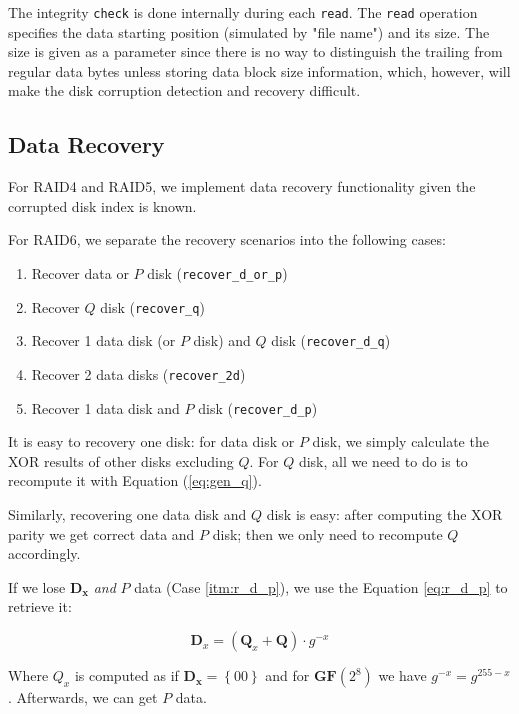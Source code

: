 The integrity \verb|check| is done internally during each \verb|read|. The \verb|read| operation specifies the data starting position (simulated by "file name") and its size. The size is given as a parameter since there is no way to distinguish the trailing from regular data bytes unless storing data block size information, which, however, will make the disk corruption detection and recovery difficult.

\subsection{Data Recovery}

For RAID4 and RAID5, we implement data recovery functionality given the corrupted disk index is known. 

For RAID6, we separate the recovery scenarios into the following cases:

\begin{enumerate}
	\item\label{itm:r_d_OR_p} Recover data or $P$ disk (\verb|recover_d_or_p|)
	\item \label{itm:r_q} Recover $Q$ disk (\verb|recover_q|)
	\item \label{itm:r_d_q} Recover 1 data disk (or $P$ disk) and $Q$ disk (\verb|recover_d_q|)
	\item \label{itm:r_2d} Recover 2 data disks (\verb|recover_2d|)
	\item \label{itm:r_d_p} Recover 1 data disk and $P$ disk (\verb|recover_d_p|)
\end{enumerate}

It is easy to recovery one disk: for data disk or $P$ disk, we simply calculate the XOR results of other disks excluding $Q$. For $Q$ disk, all we need to do is to recompute it with Equation (\ref{eq:gen_q}).

Similarly, recovering one data disk and $Q$ disk is easy: after computing the XOR parity we get correct data and $P$ disk; then we only need to recompute $Q$ accordingly.

If we lose $\mathbf{D_x}$ \emph{and} $P$ data (Case \ref{itm:r_d_p}), we use the Equation \ref{eq:r_d_p} to retrieve it:

\begin{equation}\label{eq:r_d_p}
	\mathbf{D}_x = (\mathbf{Q}_x+\mathbf{Q})\cdot g^{-x}
\end{equation}

Where $\mathbf{}Q_x$ is computed as if $\mathbf{D_x}=\left\{00\right\}$ and for $\mathbf{GF}(2^8)$ we have $g^{-x}=g^{255-x}$. Afterwards, we can get $P$ data.

